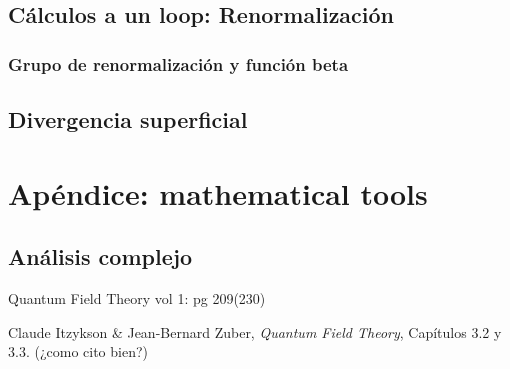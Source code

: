 \documentclass{article}
\numberwithin{equation}{section}
\begin{document}
\subsection{Cálculos a un loop: Renormalización}

\subsubsection{Grupo de renormalización y función beta}

\subsection{Divergencia superficial} 
 
\section{Apéndice: mathematical tools}

\subsection{Análisis complejo}

Quantum Field Theory vol 1: pg 209(230)


\begin{thebibliography}{9}
	
	Claude Itzykson \& Jean-Bernard Zuber,
	\textit{Quantum Field Theory},
	Capítulos 3.2 y 3.3. (¿como cito bien?)
	
\end{thebibliography}	
	
	
\end{document}

